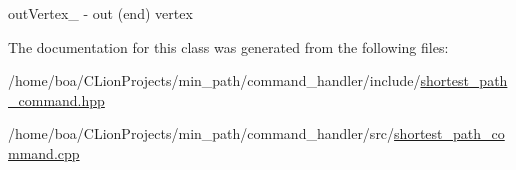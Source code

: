 out\+Vertex\+\_\+ -\/ out (end) vertex 



The documentation for this class was generated from the following files\+:\begin{DoxyCompactItemize}
\item 
/home/boa/\+C\+Lion\+Projects/min\+\_\+path/command\+\_\+handler/include/\hyperlink{a00023}{shortest\+\_\+path\+\_\+command.\+hpp}\item 
/home/boa/\+C\+Lion\+Projects/min\+\_\+path/command\+\_\+handler/src/\hyperlink{a00028}{shortest\+\_\+path\+\_\+command.\+cpp}\end{DoxyCompactItemize}
